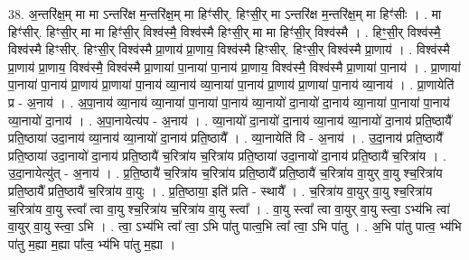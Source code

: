 \documentclass[17pt]{extarticle}
\begin{document}
38. अ॒न्तरि॑क्ष॒म् मा मा ऽन्तरि॑क्ष म॒न्तरि॑क्ष॒म् मा हिꣳ॑सीर्. हिꣳसी॒र् मा ऽन्तरि॑क्ष म॒न्तरि॑क्ष॒म् मा हिꣳ॑सीः । . मा हिꣳ॑सीर्. हिꣳसी॒र् मा मा हिꣳ॑सी॒र् विश्व॑स्मै॒ विश्व॑स्मै हिꣳसी॒र् मा मा हिꣳ॑सी॒र् विश्व॑स्मै । . हिꣳ॒॒सी॒र् विश्व॑स्मै॒ विश्व॑स्मै हिꣳसीर्. हिꣳसी॒र् विश्व॑स्मै प्रा॒णाय॑ प्रा॒णाय॒ विश्व॑स्मै हिꣳसीर्. हिꣳसी॒र् 
विश्व॑स्मै प्रा॒णाय॑ । . विश्व॑स्मै प्रा॒णाय॑ प्रा॒णाय॒ विश्व॑स्मै॒ विश्व॑स्मै प्रा॒णाया॑ पा॒नाया॑ पा॒नाय॑ प्रा॒णाय॒ विश्व॑स्मै॒ विश्व॑स्मै प्रा॒णाया॑ पा॒नाय॑ । . प्रा॒णाया॑ पा॒नाया॑ पा॒नाय॑ प्रा॒णाय॑ प्रा॒णाया॑ पा॒नाय॑ व्या॒नाय॑ व्या॒नाया॑ पा॒नाय॑ प्रा॒णाय॑ प्रा॒णाया॑ पा॒नाय॑ व्या॒नाय॑ । . प्रा॒णायेति॑ प्र - अ॒नाय॑ । . अ॒पा॒नाय॑ व्या॒नाय॑ व्या॒नाया॑ पा॒नाया॑ पा॒नाय॑ व्या॒नायो॑ दा॒नायो॑ दा॒नाय॑ व्या॒नाया॑ पा॒नाया॑ पा॒नाय॑ व्या॒नायो॑ दा॒नाय॑ । . अ॒पा॒नायेत्य॑प - अ॒नाय॑ । . व्या॒नायो॑ दा॒नायो॑ दा॒नाय॑ व्या॒नाय॑ व्या॒नायो॑ दा॒नाय॑ प्रति॒ष्ठायै᳚ प्रति॒ष्ठाया॑ उदा॒नाय॑ व्या॒नाय॑ व्या॒नायो॑ दा॒नाय॑ प्रति॒ष्ठायै᳚ । . व्या॒नायेति॑ वि - अ॒नाय॑ । . उ॒दा॒नाय॑ प्रति॒ष्ठायै᳚ प्रति॒ष्ठाया॑ उदा॒नायो॑ दा॒नाय॑ प्रति॒ष्ठायै॑ च॒रित्रा॑य च॒रित्रा॑य प्रति॒ष्ठाया॑ उदा॒नायो॑ दा॒नाय॑ प्रति॒ष्ठायै॑ च॒रित्रा॑य । . उ॒दा॒नायेत्यु॑त् - अ॒नाय॑ । . प्र॒ति॒ष्ठायै॑ च॒रित्रा॑य च॒रित्रा॑य प्रति॒ष्ठायै᳚ प्रति॒ष्ठायै॑ च॒रित्रा॑य वा॒युर् वा॒यु श्च॒रित्रा॑य प्रति॒ष्ठायै᳚ प्रति॒ष्ठायै॑ च॒रित्रा॑य वा॒युः । . प्र॒ति॒ष्ठाया॒ इति॑ प्रति - स्थायै᳚ । . च॒रित्रा॑य वा॒युर् वा॒यु श्च॒रित्रा॑य च॒रित्रा॑य वा॒यु स्त्वा᳚ त्वा वा॒यु श्च॒रित्रा॑य च॒रित्रा॑य वा॒यु स्त्वा᳚ । . वा॒यु स्त्वा᳚ त्वा वा॒युर् वा॒यु स्त्वा॒ ऽभ्य॑भि त्वा॑ वा॒युर् वा॒यु स्त्वा॒ ऽभि । . त्वा॒ ऽभ्य॑भि त्वा᳚ त्वा॒ ऽभि पा॑तु पात्व॒भि त्वा᳚ त्वा॒ ऽभि पा॑तु । . अ॒भि पा॑तु पात्व॒ भ्य॑भि पा॑तु म॒ह्या म॒ह्या पा᳚त्व॒ भ्य॑भि पा॑तु म॒ह्या । \newline
\end{document}

